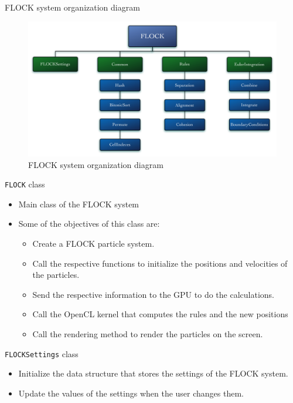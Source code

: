 \documentclass[red]{beamer}
\begin{document}
\begin{frame}{FLOCK system organization diagram}
	\begin{figure}[htbp]
	\begin{center}
	\includegraphics[scale=0.25]{../figures/FLOCKdiagramMyrna.pdf}
	\caption{FLOCK system organization diagram}
	\end{center}
	\end{figure}
\end{frame}

\begin{frame}{\texttt{FLOCK} class}
	\begin{itemize}
		\pause \item Main class of the FLOCK system
		\pause \item Some of the objectives of this class are:
			\begin{itemize}
				\pause \item Create a FLOCK particle system.
				\pause \item Call the respective functions to initialize the positions and velocities of the particles.
				\pause \item Send the respective information to the GPU to do the calculations.
				\pause \item Call the OpenCL kernel that computes the rules and the new positions
				 \pause \item Call the rendering method to render the particles on the screen.
			\end{itemize}
	\end{itemize}
\end{frame}

\begin{frame}{\texttt{FLOCKSettings} class}
	\begin{itemize}
		\pause \item Initialize the data structure that stores the settings of the FLOCK system.
		\pause \item Update the values of the settings when the user changes them.
	\end{itemize}
\end{frame}
\end{document}
